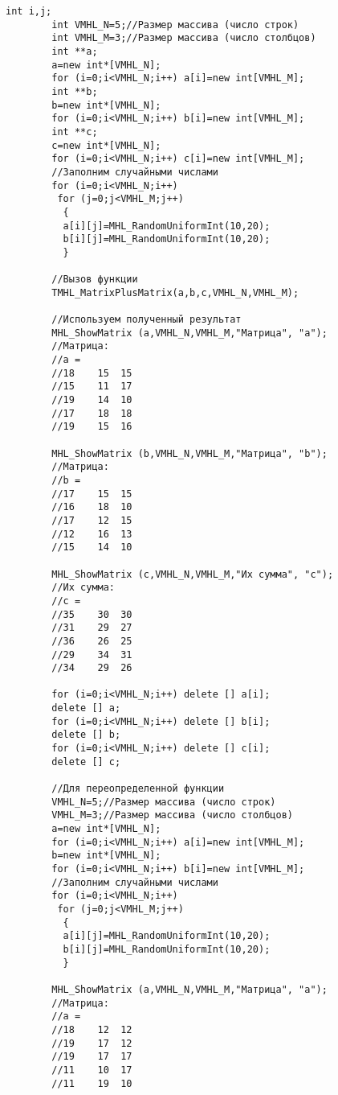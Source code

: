 \documentclass[a4paper,12pt]{article}
\begin{document}
\begin{lstlisting}[label=code_use_TMHL_MatrixPlusMatrix,caption=Пример использования]
        int i,j;
        int VMHL_N=5;//Размер массива (число строк)
        int VMHL_M=3;//Размер массива (число столбцов)
        int **a;
        a=new int*[VMHL_N];
        for (i=0;i<VMHL_N;i++) a[i]=new int[VMHL_M];
        int **b;
        b=new int*[VMHL_N];
        for (i=0;i<VMHL_N;i++) b[i]=new int[VMHL_M];
        int **c;
        c=new int*[VMHL_N];
        for (i=0;i<VMHL_N;i++) c[i]=new int[VMHL_M];
        //Заполним случайными числами
        for (i=0;i<VMHL_N;i++)
         for (j=0;j<VMHL_M;j++)
          {
          a[i][j]=MHL_RandomUniformInt(10,20);
          b[i][j]=MHL_RandomUniformInt(10,20);
          }

        //Вызов функции
        TMHL_MatrixPlusMatrix(a,b,c,VMHL_N,VMHL_M);

        //Используем полученный результат
        MHL_ShowMatrix (a,VMHL_N,VMHL_M,"Матрица", "a");
        //Матрица:
        //a =
        //18	15	15
        //15	11	17
        //19	14	10
        //17	18	18
        //19	15	16

        MHL_ShowMatrix (b,VMHL_N,VMHL_M,"Матрица", "b");
        //Матрица:
        //b =
        //17	15	15
        //16	18	10
        //17	12	15
        //12	16	13
        //15	14	10

        MHL_ShowMatrix (c,VMHL_N,VMHL_M,"Их сумма", "c");
        //Их сумма:
        //c =
        //35	30	30
        //31	29	27
        //36	26	25
        //29	34	31
        //34	29	26

        for (i=0;i<VMHL_N;i++) delete [] a[i];
        delete [] a;
        for (i=0;i<VMHL_N;i++) delete [] b[i];
        delete [] b;
        for (i=0;i<VMHL_N;i++) delete [] c[i];
        delete [] c;

        //Для переопределенной функции
        VMHL_N=5;//Размер массива (число строк)
        VMHL_M=3;//Размер массива (число столбцов)
        a=new int*[VMHL_N];
        for (i=0;i<VMHL_N;i++) a[i]=new int[VMHL_M];
        b=new int*[VMHL_N];
        for (i=0;i<VMHL_N;i++) b[i]=new int[VMHL_M];
        //Заполним случайными числами
        for (i=0;i<VMHL_N;i++)
         for (j=0;j<VMHL_M;j++)
          {
          a[i][j]=MHL_RandomUniformInt(10,20);
          b[i][j]=MHL_RandomUniformInt(10,20);
          }

        MHL_ShowMatrix (a,VMHL_N,VMHL_M,"Матрица", "a");
        //Матрица:
        //a =
        //18	12	12
        //19	17	12
        //19	17	17
        //11	10	17
        //11	19	10


\end{lstlisting}
\end{document}
